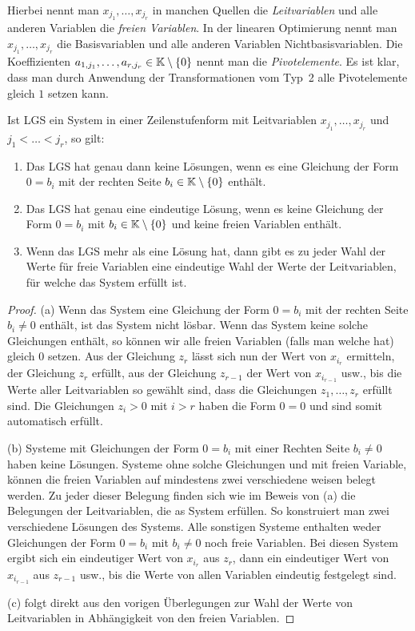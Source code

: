 Hierbei nennt man $x_{j_1},\ldots,x_{j_r}$ in manchen Quellen die \emph{Leitvariablen} und alle anderen Variablen die \emph{freien Variablen}. In der linearen Optimierung nennt man $x_{j_1},\ldots,x_{j_r}$ die Basisvariablen und alle anderen Variablen Nichtbasisvariablen. Die Koeffizienten $a_{1,j_1},\ldots,a_{r,j_r} \in \mathbb K \setminus \{0\}$ nennt man die \emph{Pivotelemente}. Es ist klar, dass man durch Anwendung der Transformationen vom Typ~2 alle Pivotelemente gleich $1$ setzen kann. 

\begin{propn}
	Ist LGS ein System in einer Zeilenstufenform mit Leitvariablen $x_{j_1},\ldots,x_{j_r}$ und $j_1 < \ldots < j_r$, so gilt: 
	\begin{enumerate}[label=(\alph*)]
		\item Das  LGS hat genau dann keine Lösungen, wenn es eine Gleichung der Form $0=b_i$ mit der rechten Seite $b_i \in \mathbb K \setminus \{0\}$ enthält. 
		\item Das LGS hat genau eine eindeutige Lösung, wenn es keine Gleichung der Form $0 = b_i$ mit $b_i \in \mathbb K \setminus \{0\}$ und keine freien Variablen enthält.
		\item Wenn das LGS mehr als eine Lösung hat, dann gibt es zu jeder Wahl der Werte für freie Variablen eine eindeutige Wahl der Werte der Leitvariablen, für welche das System erfüllt ist. 
	\end{enumerate}
\end{propn}
\begin{proof}
	(a) Wenn das System eine Gleichung der Form $0 = b_i$ mit der rechten Seite $b_i \ne 0$ enthält, ist das System nicht lösbar. Wenn das System keine solche Gleichungen enthält, so können wir alle freien Variablen (falls man welche hat) gleich $0$ setzen. Aus der Gleichung $z_r$ lässt sich nun der Wert von $x_{i_r}$ ermitteln, der Gleichung $z_r$ erfüllt, aus der Gleichung $z_{r-1}$ der Wert von $x_{i_{r-1}}$ usw., bis die Werte aller Leitvariablen so gewählt sind, dass die Gleichungen $z_1,\ldots,z_r$ erfüllt sind. Die Gleichungen $z_i> 0$ mit $i > r$ haben die Form $0=0$ und sind somit automatisch erfüllt. 
	
	(b) Systeme mit Gleichungen der Form $0 = b_i$ mit einer Rechten Seite $b_i \ne 0$ haben keine Lösungen. Systeme ohne solche Gleichungen und mit freien Variable, können die freien Variablen auf mindestens zwei verschiedene weisen belegt werden. Zu jeder dieser Belegung finden sich wie im Beweis von (a) die Belegungen der Leitvariablen, die as System erfüllen. So konstruiert man zwei verschiedene Lösungen des Systems. Alle sonstigen Systeme enthalten weder Gleichungen der Form $0 =b_i$ mit $b_i \ne 0$ noch freie Variablen. Bei diesen System ergibt sich ein eindeutiger Wert von $x_{i_r}$ aus $z_r$, dann ein eindeutiger Wert von $x_{i_{r-1}}$ aus $z_{r-1}$ usw., bis die Werte von allen Variablen eindeutig festgelegt sind. 
	
	(c) folgt direkt aus den vorigen Überlegungen zur Wahl der Werte von Leitvariablen in Abhängigkeit von den freien Variablen.
\end{proof}

